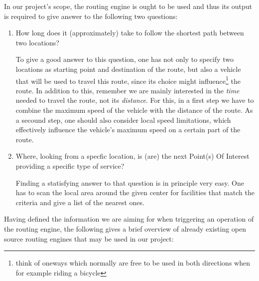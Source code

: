 In our project's scope, the routing engine is ought to be used and thus its output is required to give answer to the following two questions:

\begin{enumerate}

	\item How long does it (approximately) take to follow the shortest path between two locations?
	
		To give a good answer to this question, one has not only to specify two locations as starting point and destination of the route, but also a vehicle that will be used to travel this route, since its choice might influence\footnote{think of oneways which normally are free to be used in both directions when for example riding a bicycle} the route. In addition to this, remember we are mainly interested in the \emph{time} needed to travel the route, not its \emph{distance}. For this, in a first step we have to combine the maximum speed of the vehicle with the distance of the route. As a secound step, one should also consider local speed limitations, which effectively influence the vehicle's maximum speed on a certain part of the route.
	
	\item Where, looking from a specfic location, is (are) the next Point(s) Of Interest providing a specific type of service?
	
		Finding a statisfying answer to that question is in principle very easy. One has to scan the local area around the given center for facilities that match the criteria and give a list of the nearest ones.

\end{enumerate}

Having defined the information we are aiming for when triggering an operation of the routing engine, the following gives a brief overview of already existing open source routing engines that may be used in our project:

